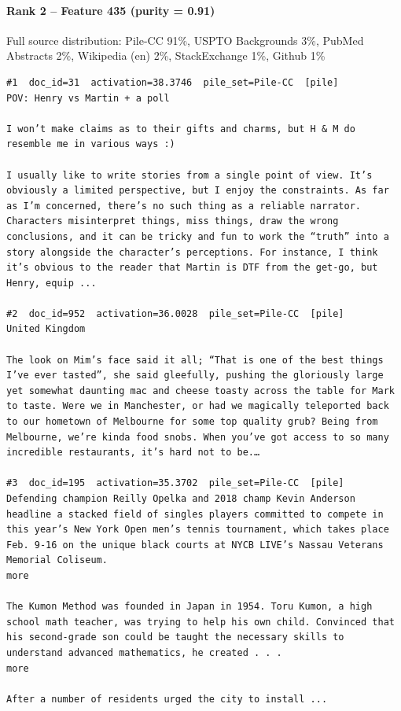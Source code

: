 \paragraph*{Rank 2 -- Feature 435 (purity = 0.91)}

Full source distribution: Pile-CC 91\%, USPTO Backgrounds 3\%, PubMed Abstracts 2\%, Wikipedia (en) 2\%, StackExchange 1\%, Github 1\%

\begin{verbatim}
#1  doc_id=31  activation=38.3746  pile_set=Pile-CC  [pile]
POV: Henry vs Martin + a poll

I won’t make claims as to their gifts and charms, but H & M do resemble me in various ways :)

I usually like to write stories from a single point of view. It’s obviously a limited perspective, but I enjoy the constraints. As far as I’m concerned, there’s no such thing as a reliable narrator. Characters misinterpret things, miss things, draw the wrong conclusions, and it can be tricky and fun to work the “truth” into a story alongside the character’s perceptions. For instance, I think it’s obvious to the reader that Martin is DTF from the get-go, but Henry, equip ...

#2  doc_id=952  activation=36.0028  pile_set=Pile-CC  [pile]
United Kingdom

The look on Mim’s face said it all; “That is one of the best things I’ve ever tasted”, she said gleefully, pushing the gloriously large yet somewhat daunting mac and cheese toasty across the table for Mark to taste. Were we in Manchester, or had we magically teleported back to our hometown of Melbourne for some top quality grub? Being from Melbourne, we’re kinda food snobs. When you’ve got access to so many incredible restaurants, it’s hard not to be.…

#3  doc_id=195  activation=35.3702  pile_set=Pile-CC  [pile]
Defending champion Reilly Opelka and 2018 champ Kevin Anderson headline a stacked field of singles players committed to compete in this year’s New York Open men’s tennis tournament, which takes place Feb. 9-16 on the unique black courts at NYCB LIVE’s Nassau Veterans Memorial Coliseum.
more

The Kumon Method was founded in Japan in 1954. Toru Kumon, a high school math teacher, was trying to help his own child. Convinced that his second-grade son could be taught the necessary skills to understand advanced mathematics, he created . . .
more

After a number of residents urged the city to install ...


\end{verbatim}
